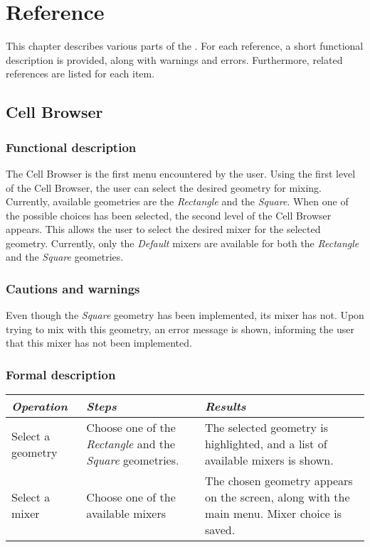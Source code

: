 \chapter{Reference}
This chapter describes various parts of the \applicationname{}. For each reference, a short functional description is provided, along with warnings and errors. Furthermore, related references are listed for each item.

\section{Cell Browser}
\label{sec:cellBrows}
  \subsection*{Functional description}
  The Cell Browser is the first menu encountered by the user. Using the first level of the Cell Browser, the user can select the desired geometry for mixing. Currently, available geometries are the \emph{Rectangle} and the \emph{Square}. When one of the possible choices has been selected, the second level of the Cell Browser appears. This allows the user to select the desired mixer for the selected geometry. Currently, only the \emph{Default} mixers are available for both the \emph{Rectangle} and the \emph{Square} geometries.
 
  \subsection*{Cautions and warnings}
  Even though the \emph{Square} geometry has been implemented, its mixer has not. Upon trying to mix with this geometry, an error message is shown, informing the user that this mixer has not been implemented.

  \subsection*{Formal description}
  \begin{tabularx}{\textwidth}{XXX}
    \toprule
    \emph{Operation} & \emph{Steps} & \emph{Results} \\
    \midrule
    Select a geometry & Choose one of the \emph{Rectangle} and the \emph{Square} geometries. & The selected geometry is highlighted, and a list of available mixers is shown. \\
    \midrule
    Select a mixer & Choose one of the available mixers & The chosen geometry appears on the screen, along with the main menu. Mixer choice is saved. \\
    \bottomrule
  \end{tabularx}

